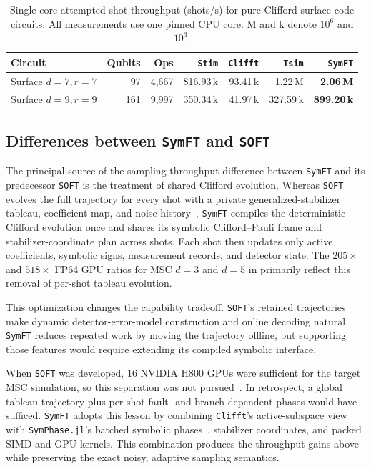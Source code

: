 \documentclass[a4paper,onecolumn,unpublished]{quantumarticle}
\newcommand{\cref}[1]{\zcref{#1}}
\newcommand{\tFont}[1]{\texttt{#1}}
\newcommand{\symft}{\tFont{SymFT}}
\newcommand{\soft}{\tFont{SOFT}}
\newcommand{\stim}{\tFont{Stim}}
\newcommand{\tsim}{\tFont{Tsim}}
\newcommand{\clifft}{\tFont{Clifft}}
\newcommand{\symphase}{\tFont{SymPhase.jl}}
\begin{document}
\begin{table}[H]
    \centering
    \small
    \setlength{\tabcolsep}{6pt}
    \caption{Single-core attempted-shot throughput (shots/s) for pure-Clifford surface-code circuits.
    All measurements use one pinned CPU core.
    M and k denote $10^6$ and $10^3$.}
    \label{tab:benchmark-pure-clifford-cpu}
    \begin{tabular}{lrrr|rrr}
        \toprule
        Circuit & Qubits & Ops & \stim{} & \clifft{} & \tsim{} & \symft{} \\
        \midrule
        Surface $d=7,r=7$ & 97 & 4{,}667
            & 816.93\,k & 93.41\,k & 1.22\,M & \textbf{2.06\,M} \\
        Surface $d=9,r=9$ & 161 & 9{,}997
            & 350.34\,k & 41.97\,k & 327.59\,k & \textbf{899.20\,k} \\
        \bottomrule
    \end{tabular}
\end{table}

\subsection{Differences between \symft{} and \soft{}}
\label{sec:benchmark-symft-soft}

The principal source of the sampling-throughput difference between \symft{} and its predecessor \soft{} is the treatment of shared Clifford evolution.
Whereas \soft{} evolves the full trajectory for every shot with a private generalized-stabilizer tableau, coefficient map, and noise history~\cite{LZZ+25}, \symft{} compiles the deterministic Clifford evolution once and shares its symbolic Clifford--Pauli frame and stabilizer-coordinate plan across shots.
Each shot then updates only active coefficients, symbolic signs, measurement records, and detector state.
The $205\times$ and $518\times$ FP64 GPU ratios for MSC $d=3$ and $d=5$ in \cref{tab:benchmark-msc-gpu} primarily reflect this removal of per-shot tableau evolution.

This optimization changes the capability tradeoff.
\soft{}'s retained trajectories make dynamic detector-error-model construction and online decoding natural.
\symft{} reduces repeated work by moving the trajectory offline, but supporting those features would require extending its compiled symbolic interface.

When \soft{} was developed, 16 NVIDIA H800 GPUs were sufficient for the target MSC simulation, so this separation was not pursued~\cite{LZZ+25}.
In retrospect, a global tableau trajectory plus per-shot fault- and branch-dependent phases would have sufficed.
\symft{} adopts this lesson by combining \clifft{}'s active-subspace view~\cite{CL26} with \symphase{}'s batched symbolic phases~\cite{FY24b}, stabilizer coordinates, and packed SIMD and GPU kernels.
This combination produces the throughput gains above while preserving the exact noisy, adaptive sampling semantics.
\end{document}
